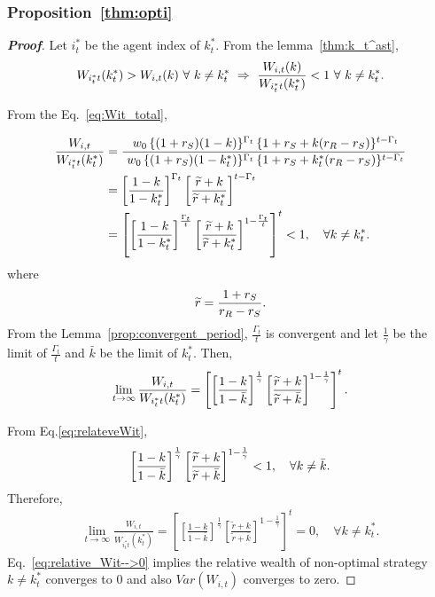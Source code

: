 \documentclass[11pt,a4paper]{article}
\begin{document}
\bigskip

\subsubsection*{Proposition~\ref{thm:opti}}

\begin{proof}[\textbf{Proof}]

	Let $i_t^\ast$ be the agent index of $k_t^\ast$. From the lemma~\ref{thm:k_t^ast}, 
		\begin{eqnarray}
			W_{i_t^\ast t}(k_t^\ast) > W_{i,t}(k)~\forall~k\neq k_t^\ast ~\Rightarrow~ \frac{W_{i,t}(k)}{W_{i_t^\ast t}(k_t^\ast) }< 1 ~\forall~k\neq k_t^\ast.\notag
		\end{eqnarray}

		From the Eq.~\eqref{eq:Wit_total},

		\begin{align}
			\frac{W_{i,t}}{W_{i_t^\ast t}(k_t^\ast)} &= \frac{\ w_0\,  \{(1+r_{S})(1-k)\}^{\Gamma_{t}}\, \{ 1+r_{S} + k(r_{R}-r_{S}) \}^{t-\Gamma_{t}}}{\ w_0\,  \{(1+r_{S})(1-k_t^\ast)\}^{\Gamma_{t}}\, \{ 1+r_{S} + k_t^\ast(r_{R}-r_{S}) \}^{t-\Gamma_{t}}}\notag\\
			&=\left[\frac{1-k}{1-k_t^\ast}\right]^{\Gamma_t}\left[\frac{\widetilde r+k}{\widetilde r+k_t^\ast}\right]^{t-\Gamma_t}\notag\\
			&=\left[\left[\frac{1-k}{1-k_t^\ast}\right]^\frac{\Gamma_t}{t}\left[\frac{\widetilde r+k}{\widetilde r+k_t^\ast}\right]^{1-\frac{\Gamma_t}{t}}\right]^t<1,\quad\forall k\neq k_t^\ast.\label{eq:relateveWit}
		\end{align}
		where
		\begin{eqnarray}
			\widetilde r=\frac{1+r_S}{r_R-r_S}.\notag
		\end{eqnarray}
		From the Lemma~\ref{prop:convergent_period}, $\frac{\Gamma_t}{t}$ is convergent and let $\frac{1}{\gamma}$ be the limit of $\frac{\Gamma_t}{t}$ and $\bar k$ be the limit of $k_t^\ast$. Then, 
		\begin{eqnarray}
			\lim_{t\rightarrow \infty}\frac{W_{i,t}}{W_{i_t^\ast t}(k_t^\ast)} = \left[\left[\frac{1-k}{1-\bar k}\right]^\frac{1}{\gamma}\left[\frac{\widetilde r+k}{\widetilde r+\bar k}\right]^{1-\frac{1}{\gamma}}\right]^t.\notag
		\end{eqnarray}
		
		From Eq.\eqref{eq:relateveWit}, 
		\begin{eqnarray}
			\left[\frac{1-k}{1-\bar k}\right]^\frac{1}{\gamma}\left[\frac{\widetilde r+k}{\widetilde r+\bar k}\right]^{1-\frac{1}{\gamma}} < 1,\quad\forall k\neq \bar k.\notag
		\end{eqnarray}
		Therefore, 
		\begin{eqnarray}\label{eq:relative_Wit-->0}
			\lim_{t\rightarrow \infty}\frac{W_{i,t}}{W_{i_t^\ast t}(k_t^\ast)} = \left[\left[\frac{1-k}{1-\bar k}\right]^\frac{1}{\gamma}\left[\frac{\widetilde r+k}{\widetilde r+\bar k}\right]^{1-\frac{1}{\gamma}}\right]^t=0,\quad \forall k\neq k_t^\ast.
		\end{eqnarray}
		Eq.~\eqref{eq:relative_Wit-->0} implies the relative wealth of non-optimal strategy $k\neq k_t^\ast$ converges to 0 and also $Var(W_{i,t})$ converges to zero.


\end{proof}
\end{document}
